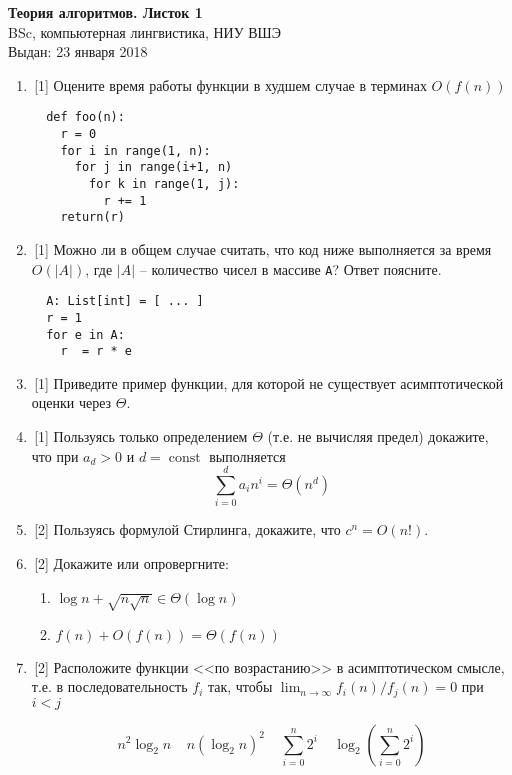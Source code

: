 \documentclass[12pt,a4paper]{report}
\def\const{\mathop{\mathrm{const}}\nolimits}
\begin{document}
\begin{center}
\textbf{\large{Теория алгоритмов. Листок 1}}\\
BSc, компьютерная лингвистика, НИУ ВШЭ\\
Выдан: 23 января 2018\\
\end{center}


\begin{enumerate}
  \item\,[1] Оцените время работы функции в худшем случае в терминах $O(f(n))$
  \begin{verbatim}
  def foo(n):
    r = 0
    for i in range(1, n):
      for j in range(i+1, n)
        for k in range(1, j):
          r += 1
    return(r)\end{verbatim}%

  \item\,[1] Можно ли в общем случае считать, что код ниже выполняется за время $O(|A|)$, где $|A|$ -- количество чисел в массиве {\tt A}? Ответ поясните.
  \begin{verbatim}
  A: List[int] = [ ... ]
  r = 1
  for e in A:
    r  = r * e\end{verbatim}%
  \item\,[1] Приведите пример функции, для которой не существует асимптотической оценки через $\Theta$.
  \item\,[1] Пользуясь только определением $\Theta$ (т.е. не вычисляя предел) докажите, что при $a_d > 0$ и $d=\const$ выполняется
  $$
  \sum_{i=0}^{d}a_i n^i = \Theta(n^d)
  $$
  \item\,[2] Пользуясь формулой Стирлинга, докажите, что $c^n = O(n!)$.
  \item\,[2] Докажите или опровергните:
    \begin{enumerate}[label=(\alph*)]
      \item $\log{n} + \sqrt{n\sqrt{n}} \in \Theta(\log{n})$
      \item $f(n) + O(f(n)) = \Theta(f(n))$
    \end{enumerate}

  \item\,[2] Расположите функции <<по возрастанию>> в асимптотическом смысле, т.е. в последовательность $f_i$ так, чтобы $\lim_{n\to\infty} f_i(n)/f_j(n) = 0$ при $i < j$

  $$
n^2\log_2n ~~~~~ n(\log_2n)^2 ~~~~~ \sum_{i=0}^n 2^i ~~~~~ \log_2\left(\sum_{i=0}^n 2^i\right)
  $$



\end{enumerate}
\end{document}
